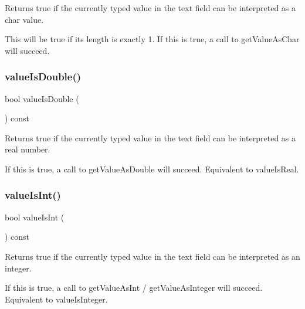 Returns true if the currently typed value in the text field can be interpreted as a char value. 

This will be true if its length is exactly 1. If this is true, a call to get\+Value\+As\+Char will succeed. \mbox{\label{classGTextField_aa80caadc7498333f74a08b4cdc0528c1}} 
\subsubsection{\texorpdfstring{value\+Is\+Double()}{valueIsDouble()}}
{\footnotesize\ttfamily bool value\+Is\+Double (\begin{DoxyParamCaption}{ }\end{DoxyParamCaption}) const\hspace{0.3cm}{\ttfamily [virtual]}}



Returns true if the currently typed value in the text field can be interpreted as a real number. 

If this is true, a call to get\+Value\+As\+Double will succeed. Equivalent to value\+Is\+Real. \mbox{\label{classGTextField_a4bccf08b3b712af3839106a1cbdc5d02}} 
\subsubsection{\texorpdfstring{value\+Is\+Int()}{valueIsInt()}}
{\footnotesize\ttfamily bool value\+Is\+Int (\begin{DoxyParamCaption}{ }\end{DoxyParamCaption}) const\hspace{0.3cm}{\ttfamily [virtual]}}



Returns true if the currently typed value in the text field can be interpreted as an integer. 

If this is true, a call to get\+Value\+As\+Int / get\+Value\+As\+Integer will succeed. Equivalent to value\+Is\+Integer. \mbox{\label{classGTextField_af5aaf003739648d9aee89a17e715a57e}} 
